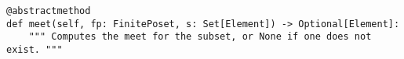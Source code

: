 \begin{verbatim}
@abstractmethod
def meet(self, fp: FinitePoset, s: Set[Element]) -> Optional[Element]:
    """ Computes the meet for the subset, or None if one does not exist. """
\end{verbatim}